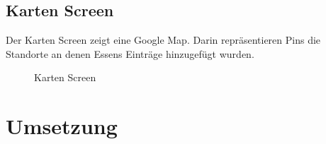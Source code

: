 \documentclass[
    DIV12,
    cleardouble=plain,
    headings=normal,
    pdftex,
    headexclude,footexclude,
    final
]{scrreprt}
\begin{document}
\section{Karten Screen}
Der Karten Screen zeigt eine Google Map. Darin repräsentieren Pins die Standorte an denen Essens Einträge hinzugefügt wurden.
\begin{figure}[H]
	\centering
	\caption{Karten Screen}
	\label{map}
\end{figure}




\newpage

\chapter{Umsetzung}
\end{document}

